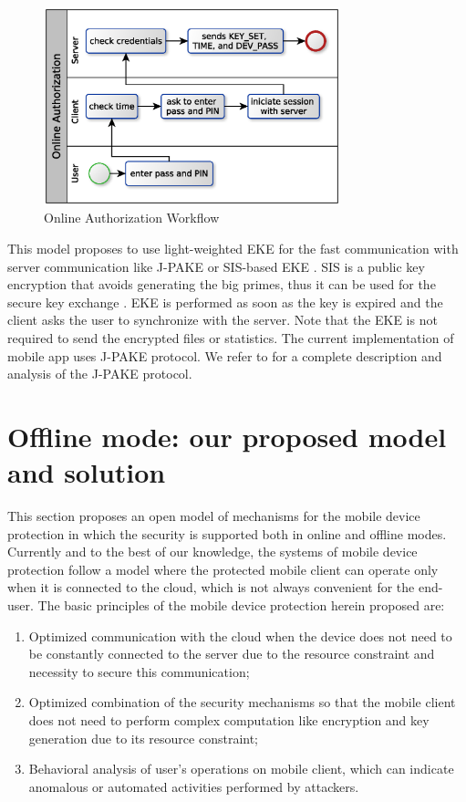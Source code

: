 \documentclass[twocolumn]{svjour3}          %
\begin{document}
\begin{figure}[h!]
	\centering
	\includegraphics[width=8.6cm]{figures/onlineauthorizationworkflow.eps}
	\caption{Online Authorization Workflow}
	\label{fig:4}
\end{figure}

This model proposes to use light-weighted EKE for the fast communication with server communication like J-PAKE \cite{hao2010j, hao2008password} or SIS-based EKE \cite{bogos2013primeless}. SIS is a public key encryption that avoids generating the big primes, thus it can be used for the secure key exchange \cite{bogos2013primeless,bellovin1992encrypted}. EKE is performed as soon as the key is expired and the client asks the user to synchronize with the server. Note that the EKE is not required to send the encrypted files or statistics. The current implementation of mobile app uses J-PAKE protocol. We refer to \cite{hao2010j, hao2008password, toorani2014security} for a complete description and analysis of the J-PAKE protocol.

\section{Offline mode: our proposed model and solution}
\label{sec_offline_mode}
This section proposes an open model of mechanisms for the mobile device protection in which the security is supported both in online and offline modes. Currently and to the best of our knowledge, the systems of mobile device protection follow a model where the protected mobile client can operate only when it is connected to the cloud, which is not always convenient for the end-user. The basic principles of the mobile device protection herein proposed are: 

\begin{enumerate}
	\item Optimized communication with the cloud when the device does not need to be constantly connected to the server due to the resource constraint and necessity to secure this communication;
	\item Optimized combination of the security mechanisms so that the mobile client does not need to perform complex computation like encryption and key generation due to its resource constraint;
	\item Behavioral analysis of user's operations on mobile client, which can indicate anomalous or automated activities performed by attackers.
\end{enumerate}
\end{document}
